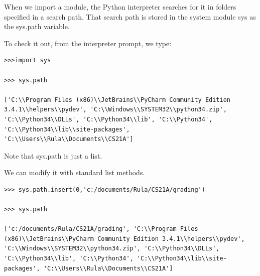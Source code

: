 \documentclass{article}
\begin{document}
When we import a module, the Python interpreter searches for it in folders specified in a search path. That search path is stored in the system module sys as the sys.path variable.

To check it out, from the interpreter prompt, we type:

\begin{lstlisting}
>>>import sys

>>> sys.path

['C:\\Program Files (x86)\\JetBrains\\PyCharm Community Edition 3.4.1\\helpers\\pydev', 'C:\\Windows\\SYSTEM32\\python34.zip', 'C:\\Python34\\DLLs', 'C:\\Python34\\lib', 'C:\\Python34', 'C:\\Python34\\lib\\site-packages', 'C:\\Users\\Rula\\Documents\\CS21A']
\end{lstlisting}

Note that sys.path is just a list. 

We can modify it with standard list methods. 

\begin{lstlisting}
>>> sys.path.insert(0,'c:/documents/Rula/CS21A/grading')

>>> sys.path

['c:/documents/Rula/CS21A/grading', 'C:\\Program Files (x86)\\JetBrains\\PyCharm Community Edition 3.4.1\\helpers\\pydev', 'C:\\Windows\\SYSTEM32\\python34.zip', 'C:\\Python34\\DLLs', 'C:\\Python34\\lib', 'C:\\Python34', 'C:\\Python34\\lib\\site-packages', 'C:\\Users\\Rula\\Documents\\CS21A']
\end{lstlisting}
\end{document}
